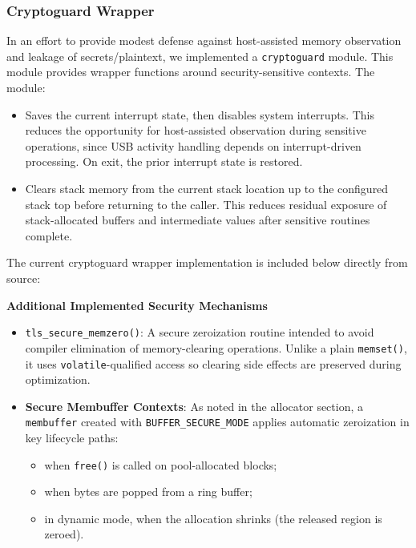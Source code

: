 \documentclass[titlepage]{report}
\begin{document}
	\subsubsection{Cryptoguard Wrapper}
	In an effort to provide modest defense against host-assisted memory observation and leakage of secrets/plaintext, we implemented a \texttt{cryptoguard} module. This module provides wrapper functions around security-sensitive contexts. The module:
	\begin{itemize}
		\item Saves the current interrupt state, then disables system interrupts. This reduces the opportunity for host-assisted observation during sensitive operations, since USB activity handling depends on interrupt-driven processing. On exit, the prior interrupt state is restored.
		\item Clears stack memory from the current stack location up to the configured stack top before returning to the caller. This reduces residual exposure of stack-allocated buffers and intermediate values after sensitive routines complete.
	\end{itemize}
	
	The current cryptoguard wrapper implementation is included below directly from source:
	
	
\textbf{Additional Implemented Security Mechanisms}
\begin{itemize}
	\item \texttt{tls\_secure\_memzero()}: A secure zeroization routine intended to avoid compiler elimination of memory-clearing operations. Unlike a plain \texttt{memset()}, it uses \texttt{volatile}-qualified access so clearing side effects are preserved during optimization.
	\item \textbf{Secure Membuffer Contexts}: As noted in the allocator section, a \texttt{membuffer} created with \texttt{BUFFER\_\allowbreak SECURE\_\allowbreak MODE} applies automatic zeroization in key lifecycle paths:
	\begin{itemize}
		\item when \texttt{free()} is called on pool-allocated blocks;
		\item when bytes are popped from a ring buffer;
		\item in dynamic mode, when the allocation shrinks (the released region is zeroed).
	\end{itemize}
\end{itemize}
\end{document}

